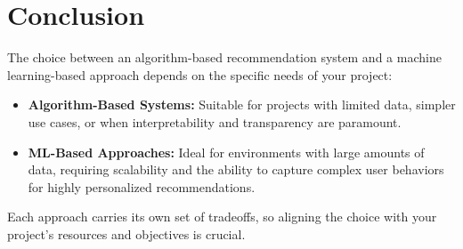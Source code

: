 \documentclass{article}
\begin{document}
\section{Conclusion}
The choice between an algorithm-based recommendation system and a machine learning-based approach depends on the specific needs of your project:
\begin{itemize}
    \item \textbf{Algorithm-Based Systems:} Suitable for projects with limited data, simpler use cases, or when interpretability and transparency are paramount.
    \item \textbf{ML-Based Approaches:} Ideal for environments with large amounts of data, requiring scalability and the ability to capture complex user behaviors for highly personalized recommendations.
\end{itemize}

Each approach carries its own set of tradeoffs, so aligning the choice with your project's resources and objectives is crucial.
\end{document}
